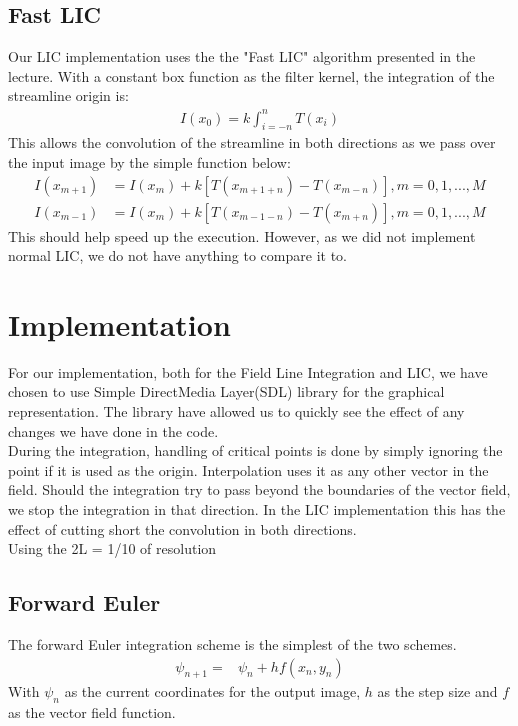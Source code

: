 \documentclass[11pt,a4paper,english]{article}
\numberwithin{equation}{section}
\begin{document}
\subsection{Fast LIC}
Our LIC implementation uses the the "Fast LIC" algorithm presented in the lecture. With a constant box function as the filter kernel, the integration of the streamline origin is: \\
\begin{align*}
	I(x_0) = k \int^{n}_{i = -n}T(x_i)
\end{align*}
This allows the convolution of the streamline in both directions as we pass over the input image by the simple function below:
\begin{align*}
	I(x_{m+1}) &= I(x_m) + k[T(x_{m+1+n}) - T(x_{m-n})], m = 0, 1,..., M	\\
	I(x_{m-1}) &= I(x_m) + k[T(x_{m-1-n}) - T(x_{m+n})], m = 0, 1,..., M
\end{align*}
This should help speed up the execution. However, as we did not implement normal LIC, we do not have anything to compare it to.

\section{Implementation}
For our implementation, both for the Field Line Integration and LIC, we have chosen to use Simple DirectMedia Layer(SDL) library for the graphical representation. The library have allowed us to quickly see the effect of any changes we have done in the code.
\\
During the integration, handling of critical points is done by simply ignoring the point if it is used as the origin. Interpolation uses it as any other vector in the field.
Should the integration try to pass beyond the boundaries of the vector field, we stop the integration in that direction. In the LIC implementation this has the effect of cutting short the convolution in both directions.
\\
Using the 2L = 1/10 of resolution

\subsection{Forward Euler}
The forward Euler integration scheme is the simplest of the two schemes. 
\begin{align*}
	\psi_{n+1} =& \psi_n + hf(x_n, y_n)
\end{align*}
With $\psi_n$ as the current coordinates for the output image, $h$ as the step size and $f$ as the vector field function.
\end{document}
